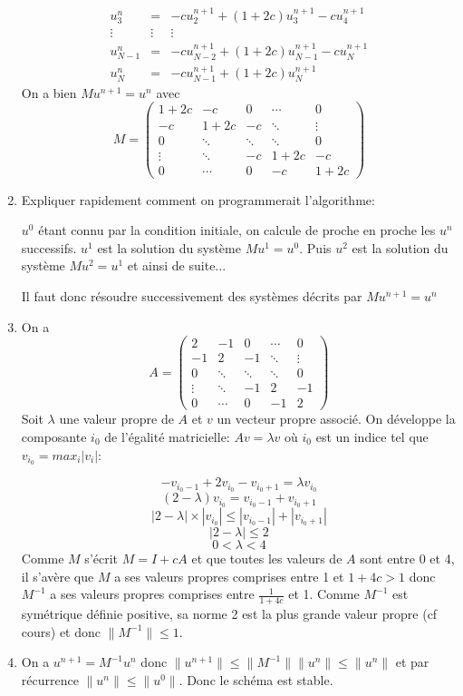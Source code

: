 \documentclass[a4paper,11pt]{article}
\begin{document}
\begin{enumerate}
\[\begin{array}{rcl}
u_3^n & = & -cu_2^{n+1}+(1+2c)u_3^{n+1}-cu_4^{n+1}\\
\vdots &\vdots &\vdots \\
u_{N-1}^n & = & -cu_{N-2}^{n+1}+(1+2c)u_{N-1}^{n+1}-cu_{N}^{n+1}\\
u_N^n & = & -cu_{N-1}^{n+1}+(1+2c)u_N^{n+1}
\end{array}\]
On a bien $ M u^{n+1} = u^n$ avec
\[M=
\left(\begin{array}{ccccc}
1+2c&-c&0&\cdots&0\\
-c&1+2c&-c&\ddots&\vdots\\
0&  \ddots &\ddots&\ddots&0\\
\vdots &\ddots &-c&1+2c&-c\\
   0&\cdots &0&-c &1+2c
\end{array}\right)
\] 

\item Expliquer rapidement comment on programmerait l'algorithme:

$u^0$ étant connu par la condition initiale, on calcule de proche en proche les $u^n$
successifs. $u^1$ est la solution du système $Mu^1=u^0$. Puis $u^2$ est la solution du système $Mu^2=u^1$ et ainsi de suite...

Il faut donc résoudre successivement des systèmes décrits par $Mu^{n+1}=u^n$ 
\item On a
\[A=
\left(\begin{array}{ccccc}
2&-1&0&\cdots&0\\
-1&2&-1&\ddots&\vdots\\
0&  \ddots &\ddots&\ddots&0\\
\vdots &\ddots &-1&2&-1\\
   0&\cdots &0&-1 &2
\end{array}\right)
\] 
Soit $\lambda$ une valeur propre de $A$ et $v$ un vecteur propre associé. On développe la composante $i_0$ de l'égalité matricielle: $Av=\lambda v$ où $i_0$ est un indice tel que $v_{i_0}=max_{i}|v_i|$:

\[-v_{i_0-1}+2v_{i_0}-v_{i_0+1}=\lambda v_{i_0}\]
\[(2-\lambda)v_{i_0} = v_{i_0-1}+v_{i_0+1}\]
\[|2-\lambda|\times |v_{i_0}| \leq |v_{i_0-1}|+|v_{i_0+1}|\]
\[|2-\lambda| \leq 2\]
\[0<\lambda<4\]
Comme $M$ s'écrit $M=I+cA$ et que toutes les valeurs de $A$ sont entre 0 et 4, il s'avère que $M$ a ses valeurs propres comprises entre 1 et $1+4c>1$ donc $M^{-1}$ a ses valeurs propres comprises entre $\frac{1}{1+4c}$ et 1. Comme $M^{-1}$ est symétrique définie positive, sa norme 2 est la plus grande valeur propre (cf cours) et donc $\|M^{-1}\|\leq 1$. 
\item On a $u^{n+1}=M^{-1}u^n$ donc $\|u^{n+1}\|\leq \|M^{-1}\| \|u^n\|\leq \|u^n\|$ et par récurrence $\|u^n\|\leq \|u^0\|$. Donc le schéma est stable.
\end{enumerate}
\end{document}
